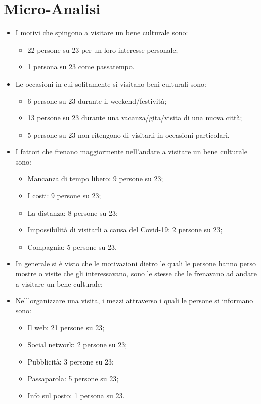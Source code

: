 \documentclass{article}
\begin{document}
\section{Micro-Analisi}
\begin{itemize}
\item I motivi che spingono a visitare un bene culturale sono:
	\begin{itemize}
	\item 22 persone su 23 per un loro interesse personale;
	\item 1 persona su 23 come passatempo.
	\end{itemize}
\item Le occasioni in cui solitamente si visitano beni culturali sono:
	\begin{itemize}
	\item 6 persone su 23 durante il weekend/festività;
	\item 13 persone su 23 durante una vacanza/gita/visita di una nuova città;
	\item 5 persone su 23 non ritengono di visitarli in occasioni particolari.
	\end{itemize}
\item I fattori che frenano maggiormente nell’andare a visitare un bene culturale sono:
	\begin{itemize}
	\item Mancanza di tempo libero: 9 persone su 23;
	\item I costi: 9 persone su 23;
	\item La distanza: 8 persone su 23;
	\item Impossibilità di visitarli a causa del Covid-19: 2 persone su 23;
	\item Compagnia: 5 persone su 23.
	\end{itemize}
\item In generale si è visto che le motivazioni dietro le quali le persone hanno perso mostre o visite che gli interessavano, sono le stesse che le frenavano ad andare a visitare un bene culturale;
\item Nell’organizzare una visita, i mezzi attraverso i quali le persone si informano sono:
	\begin{itemize}
	\item Il web: 21 persone su 23;
	\item Social network: 2 persone su 23;
	\item Pubblicità: 3 persone su 23;
	\item Passaparola: 5 persone su 23;
	\item Info sul posto: 1 persona su 23.

\end{itemize}
\end{itemize}
\end{document}
